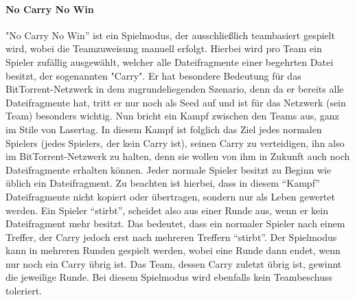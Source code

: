 \paragraph{No Carry No Win}
"No Carry No Win” ist ein Spielmodus, der ausschließlich teambasiert gespielt wird, wobei die Teamzuweisung manuell erfolgt. Hierbei wird pro Team ein Spieler zufällig ausgewählt, welcher alle Dateifragmente einer begehrten Datei besitzt, der sogenannten "Carry". Er hat besondere Bedeutung für das BitTorrent-Netzwerk in dem zugrundeliegenden Szenario, denn da er bereits alle Dateifragmente hat, tritt er nur noch als Seed auf und ist für das Netzwerk (sein Team) besonders wichtig. Nun bricht ein Kampf zwischen den Teams aus, ganz im Stile von Lasertag. In diesem Kampf ist folglich das Ziel jedes normalen Spielers (jedes Spielers, der kein Carry ist), seinen Carry zu verteidigen, ihn also im BitTorrent-Netzwerk zu halten, denn sie wollen von ihm in Zukunft auch noch Dateifragmente erhalten können.
Jeder normale Spieler besitzt zu Beginn wie üblich ein Dateifragment. Zu beachten ist hierbei, dass in diesem “Kampf” Dateifragmente nicht kopiert oder übertragen, sondern nur als Leben gewertet werden. Ein Spieler “stirbt”, scheidet also aus einer Runde aus, wenn er kein Dateifragment mehr besitzt. Das bedeutet, dass ein normaler Spieler nach einem Treffer, der Carry jedoch erst nach mehreren Treffern “stirbt”. Der Spielmodus kann in mehreren Runden gespielt werden, wobei eine Runde dann endet, wenn nur noch ein Carry übrig ist. Das Team, dessen Carry zuletzt übrig ist, gewinnt die jeweilige Runde.
Bei diesem Spielmodus wird ebenfalls kein Teambeschuss toleriert.

